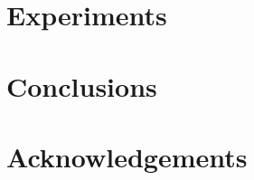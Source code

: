 \documentclass{article}
\begin{document}
\section{Experiments}

\begin{figure}
	\centering
	\newlength\fheight 
	\newlength\fwidth 
	\setlength\fheight{6cm} 
	\setlength\fwidth{6cm}
	
\end{figure}


\section{Conclusions}

\section{Acknowledgements}



\end{document}
